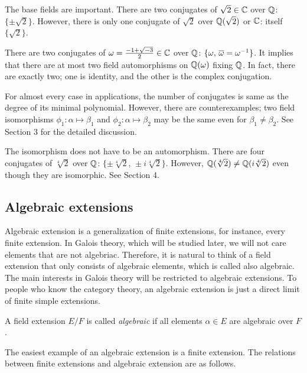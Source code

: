 \documentclass{../exp}
\begin{document}
\begin{exs}
\item
The base fields are important.
There are two conjugates of $\sqrt2\in\mathbb{C}$ over $\mathbb{Q}$: $\{\pm\sqrt2\}$.
However, there is only one conjugate of $\sqrt2$ over $\mathbb{Q}(\sqrt2)$ or $\mathbb{C}$: itself $\{\sqrt2\}$.

\item
There are two conjugates of $\omega=\frac{-1+\sqrt{-3}}2\in\mathbb{C}$ over $\mathbb{Q}$: $\{\omega,\,\overline\omega=\omega^{-1}\}$.
It implies that there are at most two field automorphisms on $\mathbb{Q}(\omega)$ fixing $\mathbb{Q}$.
In fact, there are exactly two; one is identity, and the other is the complex conjugation.

\item
For almost every case in applications, the number of conjugates is same as the degree of its minimal polynomial.
However, there are counterexamples; two field isomorphisms $\phi_1:\alpha\mapsto\beta_1$ and $\phi_2:\alpha\mapsto\beta_2$ may be the same even for $\beta_1\ne\beta_2$.
See Section 3 for the detailed discussion.

\item
The isomorphism does not have to be an automorphism.
There are four conjugates of $\sqrt[4]2$ over $\mathbb{Q}$: $\{\pm\sqrt[4]2,\,\pm i\sqrt[4]2\}$.
However, $\mathbb{Q}(\sqrt[4]2)\ne\mathbb{Q}(i\sqrt[4]2)$ even though they are isomorphic.
See Section 4.
\end{exs}




\subsection{Algebraic extensions}

Algebraic extension is a generalization of finite extensions, for instance, every finite extension.
In Galois theory, which will be studied later, we will not care elements that are not algebriac.
Therefore, it is natural to think of a field extension that only consists of algebraic elements, which is called also algebraic.
The main interests in Galois theory will be restricted to algebraic extensions.
To people who know the category theory, an algebraic extension is just a direct limit of finite simple extensions.

\begin{defn}
A field extension $E/F$ is called \emph{algebraic} if all elements $\alpha\in E$ are algebraic over $F$.
\end{defn}

The easiest example of an algebraic extension is a finite extension.
The relations between finite extensions and algebraic extension are as follows.
\end{document}
